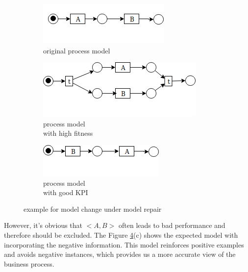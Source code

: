 \begin{figure}[h]
	\centering
	\begin{subfigure}[b]{0.32\textwidth}
		\centering
		\includegraphics[width=\linewidth]{figures/introduction/PN_modelchange_a.png}
		\caption{original process model}
		\label{fig:model_a}
	\end{subfigure}
	\hfill
	\begin{subfigure}[b]{0.32\textwidth}
		\centering
		\includegraphics[width=\linewidth]{figures/introduction/PN_modelchange_b.png}
		\caption{process model \\ with high fitness}
		\label{fig:model_b}
	\end{subfigure}
	\hfill
	\begin{subfigure}[b]{0.32\textwidth}
		\centering
		\includegraphics[width=01.0\linewidth]{figures/introduction/PN_modelchange_c.png}
		\caption{process model \\ with good KPI}
		\label{fig:model_c}
	\end{subfigure}
	
	\caption{example for model change under model repair}
	\label{fig:model_examples}
\end{figure}

However, it's obvious that $<A,B>$ often leads to bad performance and therefore should be excluded. The Figure \ref{fig:model_examples}(c) shows the expected model with incorporating the negative information. This model reinforces positive examples and avoids negative instances, which provides us a more accurate view of the business process.


